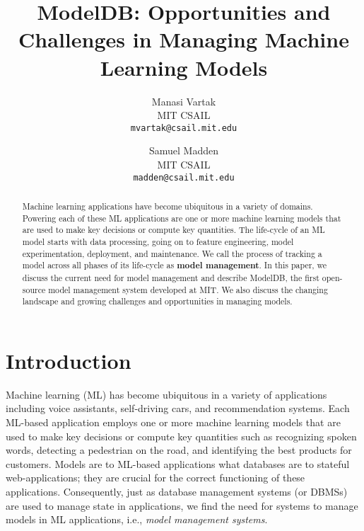 \documentclass[11pt]{article}
\title{{\sc ModelDB}: Opportunities and Challenges in Managing Machine Learning Models}
\author{
  Manasi Vartak\\
  MIT CSAIL \\
  \texttt{mvartak@csail.mit.edu}
  \and
  Samuel Madden\\
  MIT CSAIL \\
  \texttt{madden@csail.mit.edu}
}
\newcommand{\mdb}{{\sc ModelDB}\xspace}
\begin{document}
\maketitle
\begin{abstract}
Machine learning applications have become ubiquitous in a variety of domains.
Powering each of these ML applications are one or more machine learning models that are used to make key decisions or compute key quantities.
The life-cycle of an ML model starts with data processing, going on to feature engineering, model experimentation, deployment, and maintenance.
We call the process of tracking a model across all phases of its life-cycle as {\bf model management}.
In this paper, we discuss the current need for model management and describe \mdb, the first open-source model management system developed at MIT.
We also discuss the changing landscape and growing challenges and opportunities in managing models. 
\end{abstract}
\section{Introduction}
\label{sec:model-management}

Machine learning (ML) has become ubiquitous in a variety of applications including voice assistants, self-driving cars, and recommendation systems.
Each ML-based application employs one or more machine learning models that are used to make key decisions or compute key quantities such as recognizing spoken words, detecting a pedestrian on the road, and identifying the best products for customers.
Models are to ML-based applications what databases are to stateful web-applications; they are crucial for the correct functioning of these applications.
Consequently, just as database management systems (or DBMSs) are used to manage state in applications, we find the need for systems to manage models in ML applications, i.e., {\it model management systems}.

\end{document}
